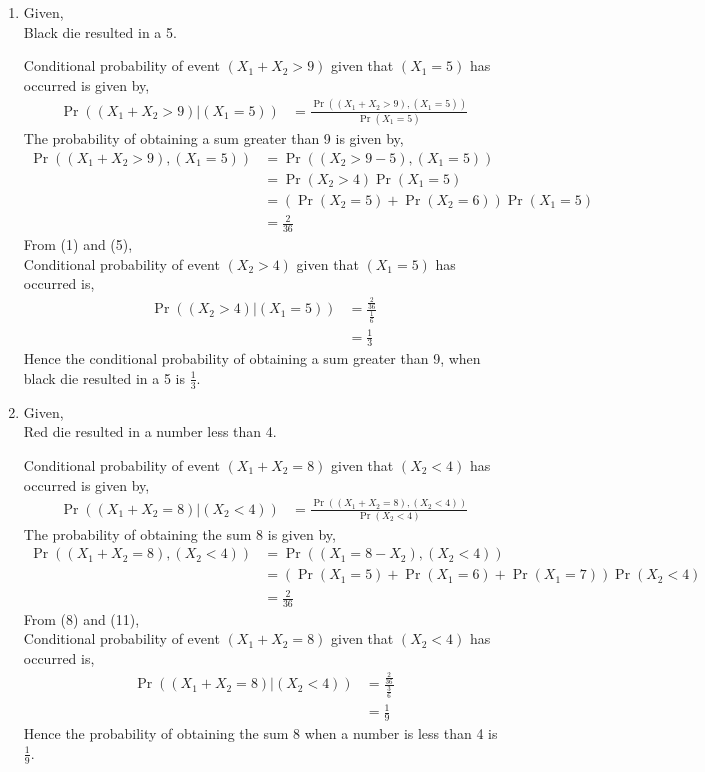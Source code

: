 \documentclass[10pt,column]{article}
\providecommand{\pr}[1]{\ensuremath{\Pr\left(#1\right)}}
\providecommand{\brak}[1]{\ensuremath{\left(#1\right)}}
\begin{document}
\begin{enumerate}
\item 
Given, \\
Black die resulted in a 5. 

Conditional probability of event $(X_1 + X_2 > 9)$ given that $(X_1 = 5)$ has occurred is given by, 
\begin{align}
\Pr{\brak{\brak{X_1 + X_2 > 9}|\brak{X_1=5}}}
&=\frac{\Pr{((X_1 + X_2 > 9),(X_1=5))}}{\Pr{\brak{X_1=5}}}
\end{align}  
The probability of obtaining a sum greater than 9 is given by,
\begin{align}
\Pr\brak{\brak{X_1 + X_2 > 9}, \brak{X_1 = 5}} 
&= \Pr\brak{\brak{X_2 > 9 - 5}, \brak{X_1 = 5}} \\
&= \pr{X_2 > 4} \pr{X_1 = 5}\\
&= (\pr{X_2 = 5} + \pr{X_2 = 6}) \pr{X_1 = 5}\\
&= \frac{2}{36}
\end{align}
From (1) and (5), \\
Conditional probability of event $(X_2 > 4)$ given that $(X_1 = 5)$ has occurred is, 
\begin{align}
\Pr{\brak{\brak{X_2 > 4}|\brak{X_1=5}}}
&=\frac{\frac{2}{36}}{\frac{1}{6}}\\
&=\frac{1}{3}
\end{align}  
Hence the conditional probability of obtaining a sum greater than 9, when black die resulted in a 5 is $\frac{1}{3}$. 

\item Given, \\
Red die resulted in a number less than 4. 

Conditional probability of event $(X_1 + X_2 = 8)$ given that $(X_2 < 4)$ has occurred is given by, 
\begin{align}
\Pr{\brak{\brak{X_1 + X_2 = 8}|\brak{X_2<4}}} 
&= \frac{\Pr{((X_1 + X_2 = 8),(X_2 < 4))}}{\Pr{\brak{X_2 < 4}}} 
\end{align} 
The probability of obtaining the sum 8 is given by,
\begin{align}
\Pr{\brak{\brak{X_1 + X_2 = 8},\brak{X_2<4}}} 
&= \Pr{\brak{\brak{X_1 = 8 - X_2},\brak{X_2<4}}} \\
&= (\pr{X_1 = 5} + \pr{X_1 = 6} + \pr{X_1 = 7}) \pr{X_2 < 4} \\
&= \frac{2}{36}
\end{align}
From (8) and (11), \\
Conditional probability of event $(X_1 + X_2 = 8)$ given that $(X_2 < 4)$ has occurred is, 
\begin{align}
\Pr{\brak{\brak{X_1 + X_2 = 8}|\brak{X_2<4}}} 
&= \frac{\frac{2}{36}}{\frac{3}{6}}\\
&= \frac{1}{9}
\end{align} 
Hence the probability of obtaining the sum 8 when a number is less than 4 is $\frac{1}{9}$. 
\end{enumerate}
\end{document}
